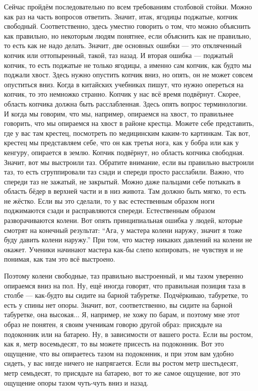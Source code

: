 Сейчас пройдём последовательно по всем требованиям столбовой 
стойки. Можно как раз на часть вопросов ответить. Значит, итак, ягодицы поджатые, копчик 
свободный. Соответственно, здесь уместно говорить о том, что можно объяснить как правильно, 
но некоторым людям понятнее, если объяснить как не правильно, то есть как не надо делать. 
Значит, две основных ошибки --- это откляченный копчик или оттопыренный, такой, таз назад. И 
вторая ошибка --- поджатый копчик, то есть поджатые не только ягодицы, а именно сам копчик, как 
будто мы поджали хвост. Здесь нужно опустить копчик вниз, но опять, он не может совсем 
опуститься вниз. Когда в китайских учебниках пишут, что нужно опереться на копчик, то это 
немножко странно. Копчик у нас всё время подвёрнут. Скорее, область копчика должна быть 
расслабленная. Здесь опять вопрос терминологии. И когда мы говорим, что мы, например, 
опираемся на хвост, то правильнее говорить, что мы опираемся на хвост в районе крестца. 
Можете себе представить, где у вас там крестец, посмотреть по медицинским каким-то 
картинкам. Так вот, крестец мы представляем себе, что он как третья нога, как у бобра или как у 
кенгуру, опирается в землю. Копчик подвёрнут, но область копчика свободная. Значит, вот мы 
выстроили таз. Обратите внимание, если вы правильно выстроили таз, то есть сгруппировали таз 
сзади и спереди просто расслабили. Важно, что спереди таз не зажатый, не закрытый. Можно 
даже пальцами себе потыкать в область бёдер в верхней части и в низ живота. Там должно быть 
мягко, то есть не жёстко. Если вы это сделали, то у вас естественным образом ноги поджимаются 
сзади и расправляются спереди. Естественным образом разворачиваются колени. Вот опять 
принципиальная ошибка у людей, которые смотрят на конечный результат: ``Ага, у мастера колени 
наружу, значит я тоже буду давить колени наружу.'' При том, что мастер никаких давлений на 
колени не окажет. Ученики начинают мастера как-бы слепо копировать, не чувствуя и не понимая,
как там это 
всё выстроено.

Поэтому колени свободные, таз правильно выстроенный, и мы тазом уверенно 
опираемся вниз на пол. Ну, ещё иногда говорят, что правильная позиция таза в столбе --- как-будто 
вы сидите на барной табуретке. Подчёркиваю, табуретке, то есть у спины нет опоры. Значит, вот, 
соответственно, вы сидите на барной табуретке, она высокая... Я, например, не хожу по 
барам, и поэтому мне этот образ не понятен, я своим ученикам говорю другой образ: присядьте на 
подоконник или на батарею. Ну, в зависимости от вашего роста. Если вы ростом, как я, метр 
восемьдесят, то вы можете присесть на подоконник. Вот это ощущение, что вы опираетесь тазом 
на подоконник, и при этом вам удобно сидеть, у вас нигде ничего не напрягается. Если вы ростом 
метр шестьдесят, метр семьдесят, то присядьте на батарею, вот то же самое ощущение, вот это 
ощущение опоры тазом чуть-чуть вниз и назад.

